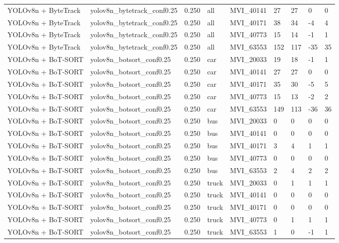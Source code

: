 \begin{tabular}{lllllllll}
YOLOv8n + ByteTrack & yolov8n\_bytetrack\_conf0.25 & 0.250 & all & MVI\_40141 & 27 & 27 & 0 & 0 \\
YOLOv8n + ByteTrack & yolov8n\_bytetrack\_conf0.25 & 0.250 & all & MVI\_40171 & 38 & 34 & -4 & 4 \\
YOLOv8n + ByteTrack & yolov8n\_bytetrack\_conf0.25 & 0.250 & all & MVI\_40773 & 15 & 14 & -1 & 1 \\
YOLOv8n + ByteTrack & yolov8n\_bytetrack\_conf0.25 & 0.250 & all & MVI\_63553 & 152 & 117 & -35 & 35 \\
YOLOv8n + BoT-SORT & yolov8n\_botsort\_conf0.25 & 0.250 & car & MVI\_20033 & 19 & 18 & -1 & 1 \\
YOLOv8n + BoT-SORT & yolov8n\_botsort\_conf0.25 & 0.250 & car & MVI\_40141 & 27 & 27 & 0 & 0 \\
YOLOv8n + BoT-SORT & yolov8n\_botsort\_conf0.25 & 0.250 & car & MVI\_40171 & 35 & 30 & -5 & 5 \\
YOLOv8n + BoT-SORT & yolov8n\_botsort\_conf0.25 & 0.250 & car & MVI\_40773 & 15 & 13 & -2 & 2 \\
YOLOv8n + BoT-SORT & yolov8n\_botsort\_conf0.25 & 0.250 & car & MVI\_63553 & 149 & 113 & -36 & 36 \\
YOLOv8n + BoT-SORT & yolov8n\_botsort\_conf0.25 & 0.250 & bus & MVI\_20033 & 0 & 0 & 0 & 0 \\
YOLOv8n + BoT-SORT & yolov8n\_botsort\_conf0.25 & 0.250 & bus & MVI\_40141 & 0 & 0 & 0 & 0 \\
YOLOv8n + BoT-SORT & yolov8n\_botsort\_conf0.25 & 0.250 & bus & MVI\_40171 & 3 & 4 & 1 & 1 \\
YOLOv8n + BoT-SORT & yolov8n\_botsort\_conf0.25 & 0.250 & bus & MVI\_40773 & 0 & 0 & 0 & 0 \\
YOLOv8n + BoT-SORT & yolov8n\_botsort\_conf0.25 & 0.250 & bus & MVI\_63553 & 2 & 4 & 2 & 2 \\
YOLOv8n + BoT-SORT & yolov8n\_botsort\_conf0.25 & 0.250 & truck & MVI\_20033 & 0 & 1 & 1 & 1 \\
YOLOv8n + BoT-SORT & yolov8n\_botsort\_conf0.25 & 0.250 & truck & MVI\_40141 & 0 & 0 & 0 & 0 \\
YOLOv8n + BoT-SORT & yolov8n\_botsort\_conf0.25 & 0.250 & truck & MVI\_40171 & 0 & 0 & 0 & 0 \\
YOLOv8n + BoT-SORT & yolov8n\_botsort\_conf0.25 & 0.250 & truck & MVI\_40773 & 0 & 1 & 1 & 1 \\
YOLOv8n + BoT-SORT & yolov8n\_botsort\_conf0.25 & 0.250 & truck & MVI\_63553 & 1 & 0 & -1 & 1 \\

\end{tabular}
